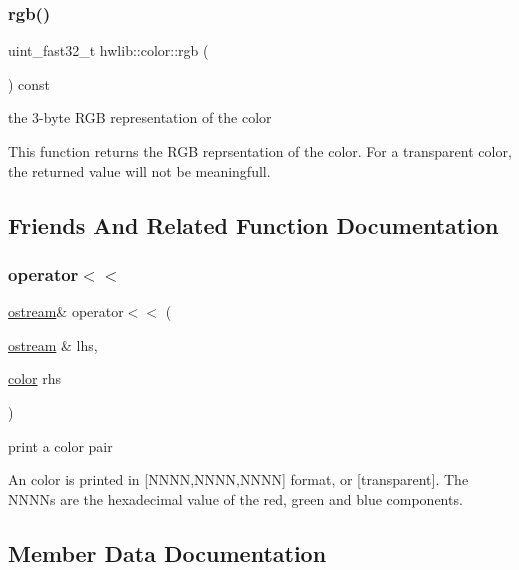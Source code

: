 \subsubsection{\texorpdfstring{rgb()}{rgb()}\hspace{0.1cm}{\footnotesize\ttfamily [2/2]}}
{\footnotesize\ttfamily uint\+\_\+fast32\+\_\+t hwlib\+::color\+::rgb (\begin{DoxyParamCaption}{ }\end{DoxyParamCaption}) const\hspace{0.3cm}{\ttfamily [inline]}}



the 3-\/byte R\+GB representation of the color 

This function returns the R\+GB reprsentation of the color. For a transparent color, the returned value will not be meaningfull. 

\subsection{Friends And Related Function Documentation}
\mbox{\label{classhwlib_1_1color_a4280fa2c98671d364a67f56cbd7ec609}} 
\subsubsection{\texorpdfstring{operator$<$$<$}{operator<<}}
{\footnotesize\ttfamily \hyperlink{classhwlib_1_1ostream}{ostream}\& operator$<$$<$ (\begin{DoxyParamCaption}\item[{\hyperlink{classhwlib_1_1ostream}{ostream} \&}]{lhs,  }\item[{\hyperlink{classhwlib_1_1color}{color}}]{rhs }\end{DoxyParamCaption})\hspace{0.3cm}{\ttfamily [friend]}}

print a color pair

An color is printed in \mbox{[}N\+N\+NN,N\+N\+NN,N\+N\+NN\mbox{]} format, or \mbox{[}transparent\mbox{]}. The N\+N\+NN\textquotesingle{}s are the hexadecimal value of the red, green and blue components. 

\subsection{Member Data Documentation}
\mbox{\label{classhwlib_1_1color_a2bb850a5013f0f4a78b29bd09444fb21}} 
